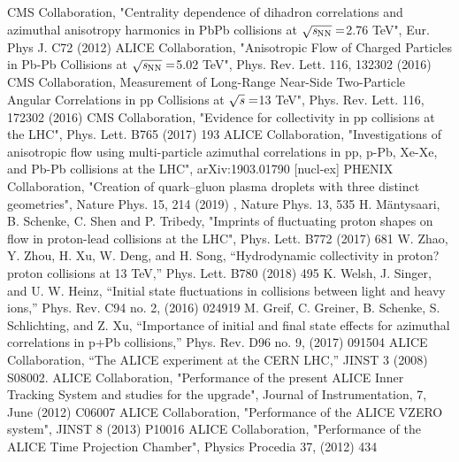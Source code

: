 \documentclass[ALICE,manyauthors]{cernphprep}
\begin{document}
\begin{thebibliography}{99}

CMS Collaboration, "Centrality dependence of dihadron correlations and azimuthal anisotropy harmonics in PbPb collisions at  $\sqrt{\it{s_{\rm{NN}}}} = $2.76 TeV",   Eur. Phys J. C72 (2012)
ALICE Collaboration, "Anisotropic Flow of Charged Particles in Pb-Pb Collisions at $\sqrt{\it{s_{\rm{NN}}}} = $5.02 TeV",  Phys. Rev. Lett. 116, 132302 (2016)
CMS Collaboration, Measurement of Long-Range Near-Side Two-Particle Angular Correlations in pp Collisions at $\sqrt{\it{s}} = $13 TeV", Phys. Rev. Lett. 116, 172302 (2016)
CMS Collaboration, "Evidence for collectivity in pp collisions at the LHC", Phys. Lett. B765 (2017) 193
ALICE Collaboration, "Investigations of anisotropic flow using multi-particle azimuthal correlations in pp, p-Pb, Xe-Xe, and Pb-Pb collisions at the LHC", arXiv:1903.01790 [nucl-ex]
PHENIX Collaboration, "Creation of quark–gluon plasma droplets with three distinct geometries", Nature Phys. 15, 214 (2019)
, Nature Phys. 13, 535
H. Mäntysaari, B. Schenke, C. Shen and P. Tribedy, "Imprints of fluctuating proton shapes on flow in proton-lead collisions at the LHC", Phys. Lett. B772 (2017) 681
W. Zhao, Y. Zhou, H. Xu, W. Deng, and H. Song, “Hydrodynamic collectivity in proton?proton collisions at 13 TeV,” Phys. Lett. B780 (2018) 495
K. Welsh, J. Singer, and U. W. Heinz, “Initial state fluctuations in collisions between light and heavy ions,” Phys. Rev. C94 no. 2, (2016) 024919
M. Greif, C. Greiner, B. Schenke, S. Schlichting, and Z. Xu, “Importance of initial and final state effects for azimuthal correlations in p+Pb collisions,” Phys. Rev. D96 no. 9, (2017) 091504
ALICE Collaboration, “The ALICE experiment at the CERN LHC,” JINST 3 (2008) S08002.
ALICE Collaboration, "Performance of the present ALICE Inner Tracking System and studies for the upgrade",  Journal of Instrumentation, 7, June (2012) C06007
ALICE Collaboration, "Performance of the ALICE VZERO system", JINST 8 (2013) P10016
ALICE Collaboration, "Performance of the ALICE Time Projection Chamber", Physics Procedia 37, (2012) 434


\end{thebibliography}
\end{document}
